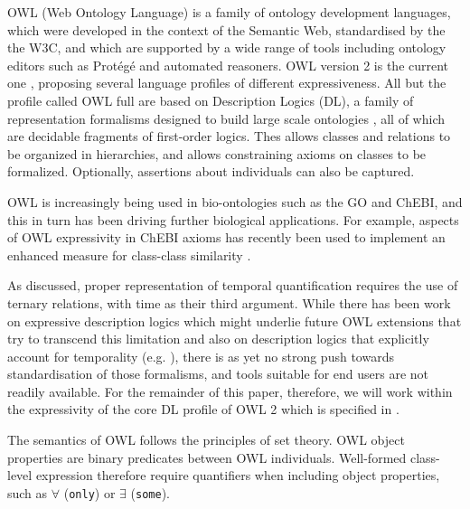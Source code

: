 OWL (Web Ontology Language) is a family of ontology development languages, which were developed in the context of the Semantic Web, 
standardised by the the W3C, and which are supported by a wide range of tools including ontology editors such as Prot\'eg\'e 
and automated reasoners. OWL version 2 is the current one \cite{grau2008}, proposing several language profiles of different expressiveness. All but the profile called OWL full are based on Description Logics (DL), a family of
representation formalisms designed to build large scale ontologies \cite{baader2007dlhandbook}, all of which are decidable fragments of first-order logics. 
Thes allows classes and relations to be organized in hierarchies, and allows constraining axioms on classes to be formalized. Optionally, assertions about individuals can also be captured. 

OWL is increasingly being used in bio-ontologies such as the GO and ChEBI, and this in turn has been driving further biological applications. For example, aspects of OWL expressivity in ChEBI axioms has recently been used to implement an enhanced measure for class-class similarity \cite{ferreira2013exploiting}.


As discussed, proper representation of temporal quantification requires the use of ternary relations, with time as their third argument. While there has been work on expressive description logics which might underlie future OWL extensions that try to transcend this limitation \cite{Calvanese:1997} and also on description logics that explicitly account for temporality (e.g. \cite{Wolter:2001}), there is as yet no strong push towards standardisation of those formalisms, and tools suitable for end users are not readily available. For the remainder of this paper, therefore, we will work within the expressivity of the core DL profile of OWL 2 which is specified in \cite{OWL2:direct}.  

 
The semantics of OWL follows the principles of set theory. OWL object properties are binary predicates between OWL individuals. %
Well-formed class-level expression therefore require quantifiers when including object properties, such as $\forall$ (\texttt{only}) or $\exists$ (\texttt{some}).

